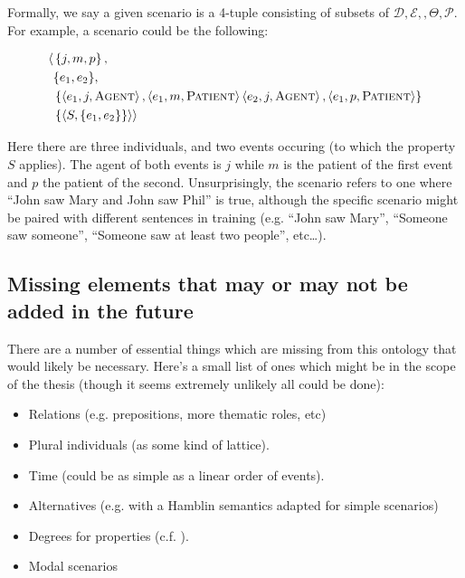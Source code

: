 \documentclass[11pt, a4paper]{article}
\begin{document}
Formally, we say a given scenario is a 4-tuple consisting of subsets of $\mathcal{D, E, }, \Theta, \mathcal{P}$.
For example, a scenario could be the following:

\begin{align*}
  \langle&\left\{j, m, p\right\}, \\
         &\{e_1, e_2\}, \\
    &\left\{
      \left\langle e_1, j, \textsc{Agent} \right\rangle, \left\langle e_1, m, \textsc{Patient} \right\rangle 
    \left\langle e_2, j, \textsc{Agent} \right\rangle, \left\langle e_1, p, \textsc{Patient} \right\rangle \right\} \\
    &\left\{ \left\langle S, \left\{ e_1, e_2 \right\}\right\} \right\rangle\rangle
\end{align*}

Here there are three individuals, and two events occuring (to which the property $S$ applies). The agent of both events is $j$ while $m$ is the patient of the first event and $p$ the patient of the second. 
Unsurprisingly, the scenario refers to one where ``John saw Mary and John saw Phil'' is true, although the specific scenario might be paired with different sentences in training (e.g. ``John saw Mary'', ``Someone saw someone'', ``Someone saw at least two people'', etc\ldots).

\subsection{Missing elements that may or may not be added in the future}

There are a number of essential things which are missing from this ontology that would likely be necessary.
Here's a small list of ones which might be in the scope of the thesis (though it seems extremely unlikely all could be done):

\begin{itemize}
  \item Relations (e.g. prepositions, more thematic roles, etc)
  \item Plural individuals (as some kind of lattice). 
  \item Time (could be as simple as a linear order of events).
  \item Alternatives (e.g. with a Hamblin semantics adapted for simple scenarios)
  \item Degrees for properties (c.f. \cite{kennedy_scale_2005}).
  \item Modal scenarios  
\end{itemize}
\end{document}

